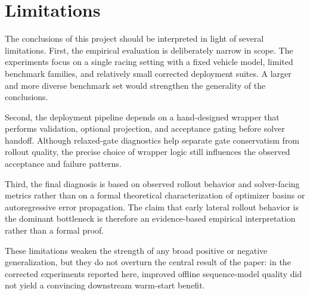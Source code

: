 \section{Limitations}
\label{sec:limitations}

The conclusions of this project should be interpreted in light of several limitations. First, the empirical evaluation is deliberately narrow in scope. The experiments focus on a single racing setting with a fixed vehicle model, limited benchmark families, and relatively small corrected deployment suites. A larger and more diverse benchmark set would strengthen the generality of the conclusions.

Second, the deployment pipeline depends on a hand-designed wrapper that performs validation, optional projection, and acceptance gating before solver handoff. Although relaxed-gate diagnostics help separate gate conservatism from rollout quality, the precise choice of wrapper logic still influences the observed acceptance and failure patterns.

Third, the final diagnosis is based on observed rollout behavior and solver-facing metrics rather than on a formal theoretical characterization of optimizer basins or autoregressive error propagation. The claim that early lateral rollout behavior is the dominant bottleneck is therefore an evidence-based empirical interpretation rather than a formal proof.

These limitations weaken the strength of any broad positive or negative generalization, but they do not overturn the central result of the paper: in the corrected experiments reported here, improved offline sequence-model quality did not yield a convincing downstream warm-start benefit.